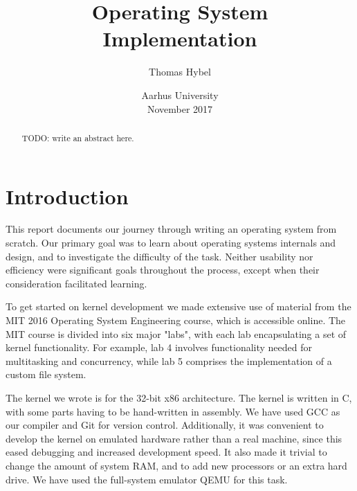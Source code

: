 \documentclass{report}
\begin{document}


\title{Operating System \\ Implementation}
\author{Thomas Hybel}
\date{Aarhus University \\ November 2017}
\maketitle




\begin{abstract} 
\noindent 
TODO: write an abstract here.
\end{abstract}
\newpage


\tableofcontents

\newpage
{}




\chapter{Introduction}
This report documents our journey through writing an operating system from
scratch. Our primary goal was to learn about operating systems internals and
design, and to investigate the difficulty of the task. Neither usability nor
efficiency were significant goals throughout the process, except when
their consideration facilitated learning.

To get started on kernel development we made extensive use of material from
the MIT 2016 Operating System Engineering course, which is accessible online.
The MIT course is divided into six major "labs", with each lab encapsulating a
set of kernel functionality. For example, lab 4 involves functionality needed
for multitasking and concurrency, while lab 5 comprises the implementation of
a custom file system. 

The kernel we wrote is for the 32-bit x86 architecture. The kernel is written
in C, with some parts having to be hand-written in assembly. 
We have used GCC as our compiler and Git for version
control. Additionally, it was convenient to develop the kernel on emulated
hardware rather than a real machine, since this eased debugging and increased
development speed. It also made it trivial to change the amount of system RAM,
and to add new processors or an extra hard drive. We have used the full-system
emulator QEMU for this task.
\end{document}
